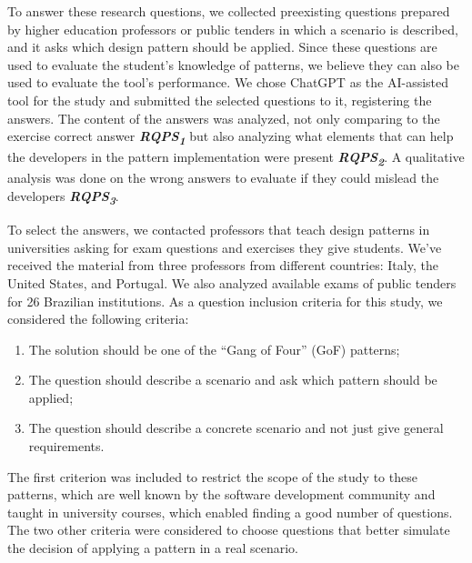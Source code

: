 To answer these research questions, we collected preexisting questions prepared by higher education professors or public tenders in which a scenario is described, and it asks which design pattern should be applied. Since these questions are used to evaluate the student's knowledge of patterns, we believe they can also be used to evaluate the tool's performance. We chose ChatGPT as the AI-assisted tool for the study and submitted the selected questions to it, registering the answers. The content of the answers was analyzed, not only comparing to the exercise correct answer \textbf{\textit{RQPS\textsubscript{1}}} but also analyzing what elements that can help the developers in the pattern implementation were present \textbf{\textit{RQPS\textsubscript{2}}}. A qualitative analysis was done on the wrong answers to evaluate if they could mislead the developers \textbf{\textit{RQPS\textsubscript{3}}}.

To select the answers, we contacted professors that teach design patterns in universities asking for exam questions and exercises they give students. We've received the material from three professors from different countries: Italy, the United States, and Portugal. We also analyzed available exams of public tenders for 26 Brazilian institutions. As a question inclusion criteria for this study, we considered the following criteria: 


\begin{enumerate}
    \item The solution should be one of the “Gang of Four” (GoF) patterns; 
    \item The question should describe a scenario and ask which pattern should be applied;
    \item The question should describe a concrete scenario and not just give general requirements. 
\end{enumerate}


The first criterion was included to restrict the scope of the study to these patterns, which are well known by the software development community and taught in university courses, which enabled finding a good number of questions. The two other criteria were considered to choose questions that better simulate the decision of applying a pattern in a real scenario.

